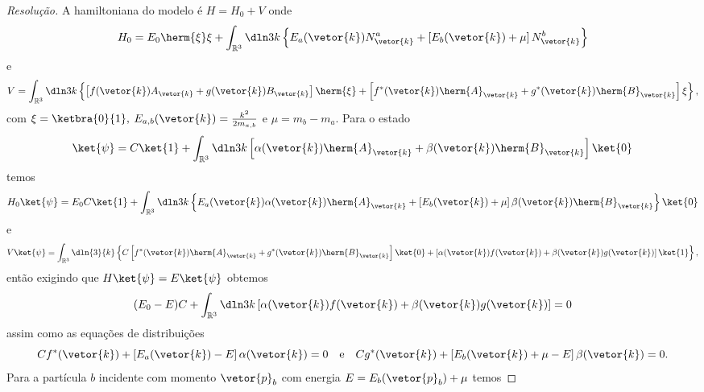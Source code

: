 \begin{proof}[Resolução]
   A hamiltoniana do modelo é \(H = H_0 + V\) onde
   \begin{equation*}
      H_0 = E_0 \herm{\xi}\xi + \int_{\mathbb{R}^3} \dln3{k} \left\{E_a(\vetor{k}) N_{\vetor{k}}^a + \left[E_b(\vetor{k}) + \mu\right]N_{\vetor{k}}^{b}\right\}
   \end{equation*}
   e
   \begin{equation*}
      V = \int_{\mathbb{R}^3} \dln3{k} \left\{\left[f(\vetor{k}) A_{\vetor{k}} + g(\vetor{k}) B_{\vetor{k}}\right]\herm{\xi}+\left[f^*(\vetor{k}) \herm{A}_{\vetor{k}} + g^*(\vetor{k}) \herm{B}_{\vetor{k}}\right]\xi\right\},
   \end{equation*}
   com \(\xi = \ketbra{0}{1},\) \(E_{a,b}(\vetor{k}) = \frac{k^2}{2 m_{a,b}}\) e \(\mu = m_b - m_a\). Para o estado
   \begin{equation*}
      \ket{\psi} = C\ket{1} + \int_{\mathbb{R}^3} \dln3{k} \left[\alpha(\vetor{k}) \herm{A}_{\vetor{k}} + \beta(\vetor{k}) \herm{B}_{\vetor{k}}\right] \ket{0}
   \end{equation*}
   temos
   \begin{equation*}
      H_0 \ket{\psi} = E_0 C\ket{1} + \int_{\mathbb{R}^3} \dln3{k} \left\{E_a(\vetor{k}) \alpha(\vetor{k}) \herm{A}_{\vetor{k}} + \left[E_{b}(\vetor{k}) + \mu \right]\beta(\vetor{k})\herm{B}_{\vetor{k}}\right\}\ket{0}
   \end{equation*}
   e
   \begin{equation*}
      V\ket{\psi} = \int_{\mathbb{R}^3} \dln{3}{k} \left\{ C\left[f^*(\vetor{k}) \herm{A}_{\vetor{k}} + g^*(\vetor{k}) \herm{B}_{\vetor{k}}\right]\ket{0} + \left[\alpha(\vetor{k})f(\vetor{k}) + \beta(\vetor{k})g(\vetor{k})\right]\ket{1}\right\},
   \end{equation*}
   então exigindo que \(H\ket{\psi} = E\ket{\psi}\) obtemos
   \begin{equation*}
      (E_0 - E)C + \int_{\mathbb{R}^3}\dln3{k} \left[\alpha(\vetor{k}) f(\vetor{k}) + \beta(\vetor{k}) g(\vetor{k})\right] = 0
   \end{equation*}
   assim como as equações de distribuições
   \begin{equation*}
      Cf^*(\vetor{k}) + \left[E_a(\vetor{k}) - E\right]\alpha(\vetor{k}) = 0
      \quad\text{e}\quad
      Cg^*(\vetor{k}) + \left[E_b(\vetor{k}) + \mu - E\right]\beta(\vetor{k}) = 0.
   \end{equation*}
   Para a partícula \(b\) incidente com momento \(\vetor{p}_b\) com energia \(E = E_b(\vetor{p}_b) + \mu\) temos

\end{proof}
